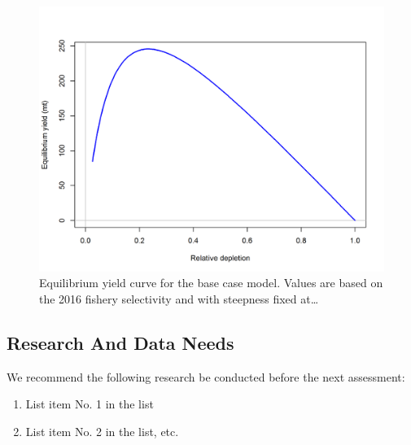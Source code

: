 \documentclass[12pt,]{article}
\begin{document}
\begin{figure}[htbp]
\centering
\includegraphics{r4ss/plots_mod1/yield1_yield_curve.png}
\caption{Equilibrium yield curve for the base case model. Values are
based on the 2016 fishery selectivity and with steepness fixed
at\ldots{} \label{fig:Yield_all}}
\end{figure}

\FloatBarrier

\newpage

\subsection*{Research And Data Needs}\label{research-and-data-needs}

We recommend the following research be conducted before the next
assessment:

\begin{enumerate}

\item List item No. 1 in the list

\item List item No. 2 in the list, etc.

\end{enumerate}

\FloatBarrier

\newpage

\renewcommand{\thefigure}{\arabic{figure}}
\renewcommand{\thetable}{\arabic{table}}

\setcounter{figure}{0} \setcounter{table}{0}
\end{document}
